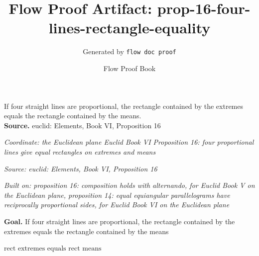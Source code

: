 \documentclass[11pt]{article}
\title{Flow Proof Artifact: prop-16-four-lines-rectangle-equality}
\author{Generated by \texttt{flow doc proof}}
\date{Flow Proof Book}
\theoremstyle{definition}
\begin{document}
\maketitle
If four straight lines are proportional, the rectangle contained by the extremes equals the rectangle contained by the means.\\[0.5em]
\textbf{Source.} euclid: Elements, Book VI, Proposition 16\\[0.5em]
\bigskip
{}\par
\smallskip\noindent\textit{Coordinate: the Euclidean plane \cdot Euclid Book VI \cdot Proposition 16: four proportional lines give equal rectangles on extremes and means}\par
\smallskip\noindent\textit{Source: euclid: Elements, Book VI, Proposition 16}\par
\smallskip\noindent\textit{Built on: proposition 16: composition holds with alternando, for Euclid Book V on the Euclidean plane, proposition 14: equal equiangular parallelograms have reciprocally proportional sides, for Euclid Book VI on the Euclidean plane}\par
\medskip
\noindent\textbf{Goal.} If four straight lines are proportional, the rectangle contained by the extremes equals the rectangle contained by the means\par
\noindent$\displaystyle \text{rect extremes equals rect means}$\par
\medskip
\noindent
\end{document}
